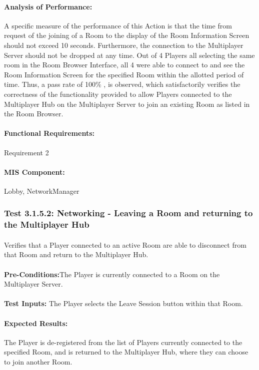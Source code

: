 \documentclass{article}
\begin{document}
    \paragraph{Analysis of Performance:} A specific measure of the performance of this Action is that the time from request of the joining of a Room to the display of the Room Information Screen should not exceed 10 seconds. Furthermore, the connection to the Multiplayer Server should not be dropped at any time. Out of 4 Players all selecting the same room in the Room Browser Interface, all 4 were able to connect to and see the Room Information Screen for the specified Room within the allotted period of time.  Thus, a pass rate of 100\% , is observed, which satisfactorily verifies the correctness of the functionality provided to allow Players connected to the Multiplayer Hub on the Multiplayer Server to join an existing Room as listed in the Room Browser.
    \paragraph{Functional Requirements:} Requirement 2
    \paragraph{MIS Component:} Lobby, NetworkManager
    
    \subsubsection{Test 3.1.5.2: Networking - Leaving a Room and returning to the Multiplayer Hub}
    \paragraph{} Verifies that a Player connected to an active Room are able to disconnect from that Room and return to the Multiplayer Hub.
    \paragraph{}\textbf{Pre-Conditions:}The Player is currently connected to a Room on the Multiplayer Server.
    \paragraph{}\textbf{Test Inputs:} The Player selects the Leave Session button within that Room.
    \paragraph{Expected Results:} The Player is de-registered from the list of Players currently connected to the specified Room, and is returned to the Multiplayer Hub, where they can choose to join another Room.
\end{document}
